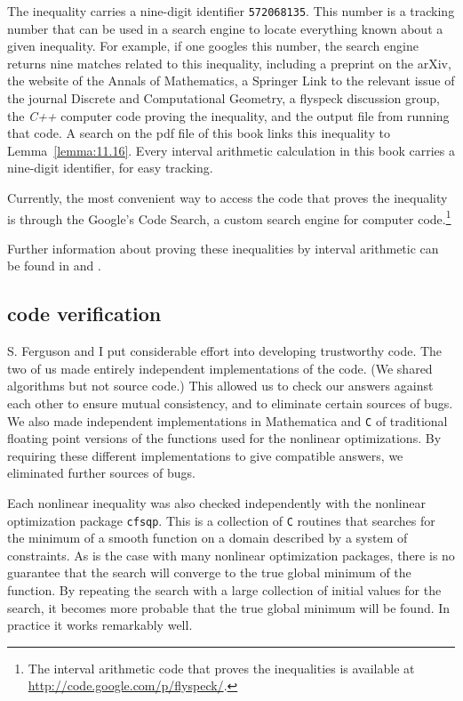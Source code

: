 The inequality carries a nine-digit identifier {\tt 572068135}.  This
number is a tracking number that can be used in a search engine to
locate everything known about a given inequality.  For example, if one
googles this number, the search engine returns nine matches related to
this inequality, including a preprint on the arXiv, the website of the
Annals of Mathematics, a Springer Link to the relevant issue of the
journal Discrete and Computational Geometry, a flyspeck discussion
group, the {\it C++} computer code proving the inequality, and the
output file from running that code.  A search on the pdf file of this
book links this inequality to Lemma~\ref{lemma:11.16}.  Every interval
arithmetic calculation in this book carries a nine-digit identifier,
for easy tracking.

Currently, the most convenient way to access the code that proves the
inequality is through the Google's Code Search, a custom search engine
for computer code.\footnote{The interval arithmetic code that proves
  the inequalities is available at
  \url{http://code.google.com/p/flyspeck/}.}


Further information about proving these inequalities by interval
arithmetic can be found in \cite{algorithm} and \cite{part1}.

\subsection{code verification}

S. Ferguson and I put considerable effort into developing trustworthy
code.  The two of us made entirely independent implementations of
the code. %
(We shared algorithms
but not source code.)  This allowed us to check our answers against each
other to ensure mutual consistency, 
and to eliminate certain sources of bugs.  We also made independent
implementations in Mathematica and {\tt C} of traditional floating point
versions of the functions used for the nonlinear
optimizations.  By requiring these different implementations to give
compatible answers, we eliminated further sources of bugs.

Each nonlinear inequality was also checked independently with the
nonlinear optimization package {\tt cfsqp}.  This is a collection of
{\tt C} routines that searches for the minimum of a smooth function on
a domain described by a system of constraints.  As is the case with
many nonlinear optimization packages, there is no guarantee that the
search will converge to the true global minimum of the function.  By
repeating the search with a large collection of initial values for the
search, it becomes more probable that the true global minimum will be
found.  In practice it works remarkably well.

